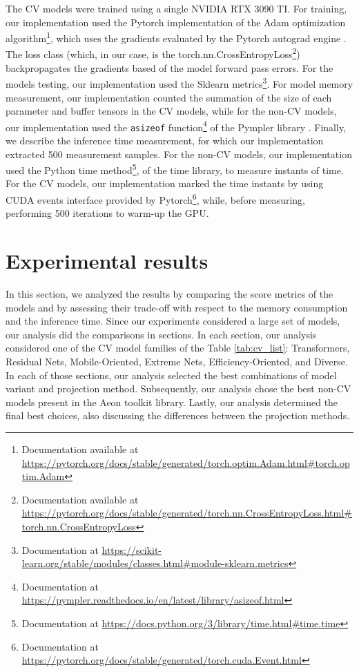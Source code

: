 The \gls{CV} models were trained using a single NVIDIA RTX 3090 TI. For training, our implementation used the Pytorch implementation of the Adam optimization algorithm\footnote{Documentation available at \url{https://pytorch.org/docs/stable/generated/torch.optim.Adam.html\#torch.optim.Adam}}, which uses the gradients evaluated by the Pytorch autograd engine \cite{Pytorch}. The loss class (which, in our case, is the torch.nn.CrossEntropyLoss\footnote{Documentation available at \url{https://pytorch.org/docs/stable/generated/torch.nn.CrossEntropyLoss.html\#torch.nn.CrossEntropyLoss}}) backpropagates the gradients based of the model forward pass errors. For the models testing, our implementation used the Sklearn \cite{Sklearn} metrics\footnote{Documentation at \url{https://scikit-learn.org/stable/modules/classes.html\#module-sklearn.metrics}}. For model memory measurement, our implementation counted the summation of the size of each parameter and buffer tensors in the \gls{CV} models, while for the non-\gls{CV} models, our implementation used the \texttt{asizeof} function\footnote{Documentation at \url{https://pympler.readthedocs.io/en/latest/library/asizeof.html}} of the Pympler library \cite{Pympler}. Finally, we describe the inference time measurement, for which our implementation extracted 500 measurement samples. For the non-\gls{CV} models, our implementation used the Python time method\footnote{Documentation at \url{https://docs.python.org/3/library/time.html\#time.time}}, of the time library, to measure instants of time. For the \gls{CV} models, our implementation marked the time instants by using CUDA events interface provided by Pytorch\footnote{Documentation at \url{https://pytorch.org/docs/stable/generated/torch.cuda.Event.html}}, while, before measuring, performing 500 iterations to warm-up the GPU. 

\section{Experimental results}

In this section, we analyzed the results by comparing the score metrics of the models and by assessing their trade-off with respect to the memory consumption and the inference time. Since our experiments considered a large set of models, our analysis did the comparisons in sections. In each section, our analysis considered one of the \gls{CV} model families of the Table \ref{tab:cv_list}: Transformers, Residual Nets, Mobile-Oriented, Extreme Nets, Efficiency-Oriented, and Diverse. In each of those sections, our analysis selected the best combinations of model variant and projection method. Subsequently, our analysis chose the best non-\gls{CV} models present in the Aeon toolkit library. Lastly, our analysis determined the final best choices, also discussing the differences between the projection methods.

